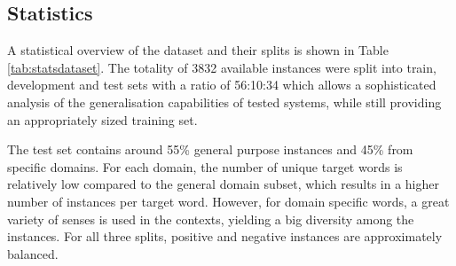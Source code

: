 \documentclass[11pt,a4paper]{article}
\begin{document}
\begin{table}[t]
\setlength{\tabcolsep}{7.0pt}
\caption{\label{tab:statsdataset} Statistics of training, development and testing splits of WiC-TSV, including total number of instances (Total), unique number of target words ($N_w$) and percentage of positive instances ($R_+$).}
\end{table}


\subsection{Statistics}
\label{statistics}
A statistical overview of the dataset and their splits is shown in Table \ref{tab:statsdataset}. The totality of 3832 available instances were split into train, development and test sets with a ratio of 56:10:34 which allows a sophisticated analysis of the generalisation capabilities of tested systems, while still providing an appropriately sized training set.
 
The test set contains around 55\% general purpose instances and 45\% from specific domains. For each domain, the number of unique target words is relatively low compared to the general domain subset, which results in a higher number of instances per target word. However, for domain specific words, a great variety of senses is used in the contexts, yielding a big diversity among the instances. 
For all three splits, positive and negative instances are approximately balanced.
\end{document}
